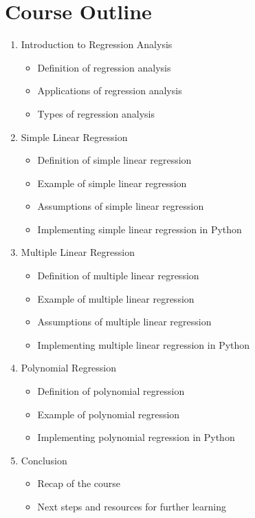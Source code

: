 \documentclass[12pt]{article}
\begin{document}
\section{Course Outline}
\begin{enumerate}[label=\arabic*.]
\item Introduction to Regression Analysis
\begin{itemize}
\item Definition of regression analysis
\item Applications of regression analysis
\item Types of regression analysis
\end{itemize}
\item Simple Linear Regression
\begin{itemize}
\item Definition of simple linear regression
\item Example of simple linear regression
\item Assumptions of simple linear regression
\item Implementing simple linear regression in Python
\end{itemize}
\item Multiple Linear Regression
\begin{itemize}
\item Definition of multiple linear regression
\item Example of multiple linear regression
\item Assumptions of multiple linear regression
\item Implementing multiple linear regression in Python
\end{itemize}
\item Polynomial Regression
\begin{itemize}
\item Definition of polynomial regression
\item Example of polynomial regression
\item Implementing polynomial regression in Python
\end{itemize}
\item Conclusion
\begin{itemize}
\item Recap of the course
\item Next steps and resources for further learning
\end{itemize}
\end{enumerate}
\end{document}
